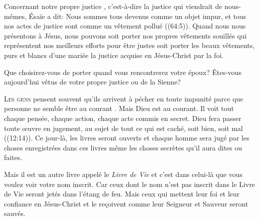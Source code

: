 
Concernant notre \Og propre justice \Fg{}, c'est-à-dire la justice
 qui viendrait de nous-mêmes, Ésaïe a dit: 
 \Og Nous sommes tous devenus comme un objet impur,
 et tous nos actes de justice sont comme un vêtement pollué \Fg{}
 ((64:5)). Quand nous nous présentons à Jésus,
 nous pouvons soit porter nos propres vêtements souillés
 \ocadr qui représentent nos meilleurs efforts pour être justes \fcadr{}
 soit porter les beaux vêtements, purs et blancs d'une mariée
 \ocadr la justice acquise en Jésus-Christ par la foi. 

Que choisirez-vous de porter quand vous rencontrerez votre époux?
 Êtes-vous aujourd'hui vêtus de votre propre justice ou de la Sienne? 

\dvrule






\lettrine{L}{es gens} pensent souvent qu'ils arrivent à pécher
 en toute impunité parce que personne ne semble être au courant
 .
 Mais Dieu est au courant. Il voit tout \ocadr chaque pensée,
 chaque action, chaque acte commis en secret.
 \Og Dieu fera passer toute \oe{}uvre en jugement,
 au sujet de tout ce qui est caché, soit bien, soit mal \Fg{}
 ((12:14)).
 Ce jour-là, les livres seront ouverts et chaque homme
 sera jugé par les choses enregistrées dans ces livres
 \ocadr même les choses secrètes qu'il aura dites ou faites. 

Mais il est un autre livre appelé le \emph{Livre de Vie}
 et c'est dans celui-là que vous voulez voir votre nom inscrit.
 Car ceux dont le nom n'est pas inscrit dans le Livre de Vie
 seront jetés dans l'étang de feu.
 Mais ceux qui mettent leur foi et leur confiance en Jésus-Christ
 et le re\c{c}oivent comme leur Seigneur et Sauveur seront sauvés. 

